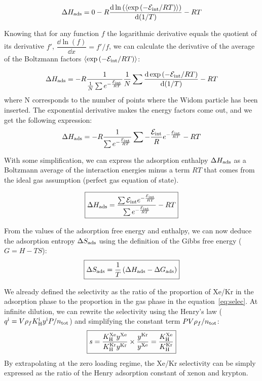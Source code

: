 \documentclass[main.tex]{subfiles}
\begin{document}
\begin{equation}
  \Delta H_{\text{ads}} = 0 - R\dfrac{\mathop{}\mathopen{}\mathrm{d} \ln\left(\langle \exp\left(-\mathcal{E}_{\text{int}}/RT\right) \rangle\right)}{\mathop{}\mathopen{}\mathrm{d} (1/T)} - RT
\end{equation}

Knowing that for any function $f$ the logarithmic derivative equals the quotient of its derivative $f'$, $\dfrac{\dd \ln\left(f\right)}{\dd x}=f'/f$, we can calculate the derivative of the average of the Boltzmann factors $\langle \exp\left(-\mathcal{E}_{\text{int}}/RT\right) \rangle$:

\begin{equation}
  \Delta H_{\text{ads}} = -R\dfrac{1}{\frac{1}{N}\sum e^{-\frac{\mathcal{E}_{\text{int}}}{RT}}} \frac{1}{N}\sum \dfrac{\mathop{}\mathopen{}\mathrm{d} \exp\left(-\mathcal{E}_{\text{int}}/RT\right)}{\mathop{}\mathopen{}\mathrm{d} (1/T)} - RT
\end{equation}
where N corresponds to the number of points where the Widom particle has been inserted.
The exponential derivative makes the energy factors come out, and we get the following expression:
\begin{equation}
  \Delta H_{\text{ads}} = -R\dfrac{1}{\sum e^{-\frac{\mathcal{E}_{\text{int}}}{RT}}} \sum - \frac{\mathcal{E}_{\text{int}}}{R} e^{-\frac{\mathcal{E}_{\text{int}}}{RT}} - RT
\end{equation}

With some simplification, we can express the adsorption enthalpy $\Delta H_{\text{ads}}$ as a Boltzmann average of the interaction energies minus a term $RT$ that comes from the ideal gas assumption (perfect gas equation of state).

\begin{equation}\label{eq:ads_enthalpy}
  \boxed{
  \Delta H_{\text{ads}} = \dfrac{\sum \mathcal{E}_{\text{int}}e^{-\frac{\mathcal{E}_{\text{int}}}{RT}}}{\sum e^{-\frac{\mathcal{E}_{\text{int}}}{RT}}} - RT
  }
\end{equation}

From the values of the adsorption free energy and enthalpy, we can now deduce the adsorption entropy $\Delta S_{\text{ads}}$ using the definition of the Gibbs free energy ($G = H-TS$):
\begin{equation}\label{eq:ads_entropy}
  \boxed{
  \Delta S_{\text{ads}} = \dfrac{1}{T} \left(\Delta H_{\text{ads}} - \Delta G_{\text{ads}} \right)
  }
\end{equation}

We already defined the selectivity as the ratio of the proportion of Xe/Kr in the adsorption phase to the proportion in the gas phase in the equation~\ref{eq:selec}. At infinite dilution, we can rewrite the selectivity using the Henry's law ($q^{\text{i}}=V\rho_f K_{\text{H}}^{\text{i}}y^{\text{i}}P/n_{\text{tot}}$) and simplifying the constant term $PV\rho_f/n_{\text{tot}}$:
\begin{equation}\label{eq:selec_0}
  \boxed{
  s = \dfrac{K_{\text{H}}^{\text{Xe}}y^{\text{Xe}}}{K_{\text{H}}^{\text{Kr}}y^{\text{Kr}}}\times\dfrac{y^{\text{Kr}}}{y^{\text{Xe}}} = \dfrac{K_{\text{H}}^{\text{Xe}}}{K_{\text{H}}^{\text{Kr}}}
  }
\end{equation}
By extrapolating at the zero loading regime, the Xe/Kr selectivity can be simply expressed as the ratio of the Henry adsorption constant of xenon and krypton.
\end{document}
